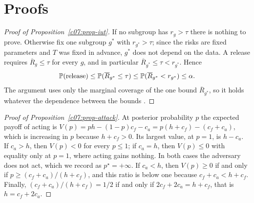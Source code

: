 \section{Proofs}\label{c07:sec-proofs}

\begin{proof}[Proof of Proposition~\ref{c07:prop-iut}]
If no subgroup has $r_g > \tau$ there is nothing to prove. Otherwise fix one
subgroup $g^\ast$ with $r_{g^\ast} > \tau$; since the risks are fixed parameters and
$T$ was fixed in advance, $g^\ast$ does not depend on the data. A release requires
$\overline{R}_g \le \tau$ for every $g$, and in particular
$\overline{R}_{g^\ast} \le \tau < r_{g^\ast}$. Hence
\[
\mathbb{P}(\text{release}) \le \mathbb{P}(\overline{R}_{g^\ast} \le \tau)
\le \mathbb{P}(\overline{R}_{g^\ast} < r_{g^\ast}) \le \alpha .
\]
The argument uses only the marginal coverage of the one bound
$\overline{R}_{g^\ast}$, so it holds whatever the dependence between the bounds
\citep{berger1982}.
\end{proof}

\begin{proof}[Proof of Proposition~\ref{c07:prop-attack}]
At posterior probability $p$ the expected payoff of acting is
$V(p) = ph - (1-p)c_f - c_a = p(h + c_f) - (c_f + c_a)$, which is increasing in $p$
because $h + c_f > 0$. Its largest value, at $p = 1$, is $h - c_a$. If $c_a > h$,
then $V(p) < 0$ for every $p \le 1$; if $c_a = h$, then $V(p) \le 0$ with equality
only at $p = 1$, where acting gains nothing. In both cases the adversary does not
act, which we record as $p^\star = +\infty$. If $c_a < h$, then $V(p) \ge 0$ if and
only if $p \ge (c_f + c_a)/(h + c_f)$, and this ratio is below one because
$c_f + c_a < h + c_f$. Finally, $(c_f + c_a)/(h + c_f) = 1/2$ if and only if
$2c_f + 2c_a = h + c_f$, that is $h = c_f + 2c_a$.
\end{proof}
